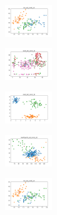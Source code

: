 \begin{figure}[H]
\begin{subfigure}
    \end{subfigure}
    \hfill
    \begin{subfigure}
        \centering
        \includegraphics[width=0.234\textwidth]{img/am10/iris_set_const_10_589741062_clust.png}
    \end{subfigure}
    \hfill
    \begin{subfigure}
        \centering
        \includegraphics[width=0.234\textwidth]{img/am10/ecoli_set_const_10_589741062_clust.png}
    \end{subfigure}
    \hfill
    \begin{subfigure}
        \centering
        \includegraphics[width=0.234\textwidth]{img/am10/rand_set_const_10_589741062_clust.png}
    \end{subfigure}
    \hfill
    \begin{subfigure}
        \centering
        \includegraphics[width=0.234\textwidth]{img/am10/newthyroid_set_const_10_589741062_clust.png}
    \end{subfigure}
    \hfill
    \begin{subfigure}
        \centering
        \includegraphics[width=0.234\textwidth]{img/am10/iris_set_const_10_277451237_clust.png}
    \end{subfigure}
    \hfill

\end{figure}
